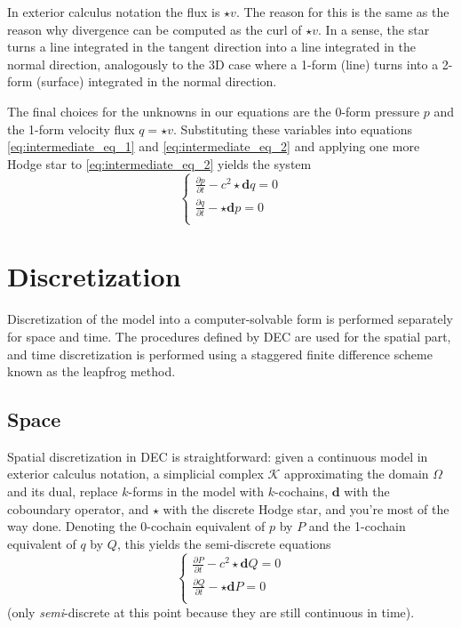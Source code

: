 \documentclass[utf8,english]{gradu3}
\begin{document}
In exterior calculus notation the flux is $\star v$.
The reason for this is the same as the reason
why divergence can be computed as the curl of $\star v$.
In a sense, the star turns a line integrated in the tangent direction
into a line integrated in the normal direction,
analogously to the 3D case where a 1-form (line)
turns into a 2-form (surface) integrated in the normal direction.

The final choices for the unknowns in our equations
are the 0-form pressure $p$
and the 1-form velocity flux $q = \star v$.
Substituting these variables into equations \eqref{eq:intermediate_eq_1}
and \eqref{eq:intermediate_eq_2} and applying one more Hodge star 
to \eqref{eq:intermediate_eq_2} yields the system
\begin{equation}
  \begin{cases}
    \frac{\partial p}{\partial t} - c^2 \star \mathbf{d} q = 0 \\
    \frac{\partial q}{\partial t} - \star \mathbf{d} p = 0 \\
  \end{cases}
\end{equation}


\section{Discretization}

Discretization of the model into a computer-solvable form
is performed separately for space and time.
The procedures defined by DEC are used for the spatial part,
and time discretization is performed using a staggered
finite difference scheme known as the leapfrog method.


\subsection{Space}

Spatial discretization in DEC is straightforward:
given a continuous model in exterior calculus notation,
a simplicial complex $\mathcal{K}$ approximating the domain $\Omega$ and its dual,
replace $k$-forms in the model with $k$-cochains,
$\mathbf{d}$ with the coboundary operator,
and $\star$ with the discrete Hodge star,
and you're most of the way done.
Denoting the 0-cochain equivalent of $p$ by $P$
and the 1-cochain equivalent of $q$ by $Q$,
this yields the semi-discrete equations
\begin{equation}\label{eq:semi_discrete_model}
  \begin{cases}
    \frac{\partial P}{\partial t} - c^2 \star \mathbf{d} Q = 0 \\
    \frac{\partial Q}{\partial t} - \star \mathbf{d} P = 0 \\
  \end{cases}
\end{equation}
(only \textit{semi}-discrete at this point
because they are still continuous in time).
\end{document}

